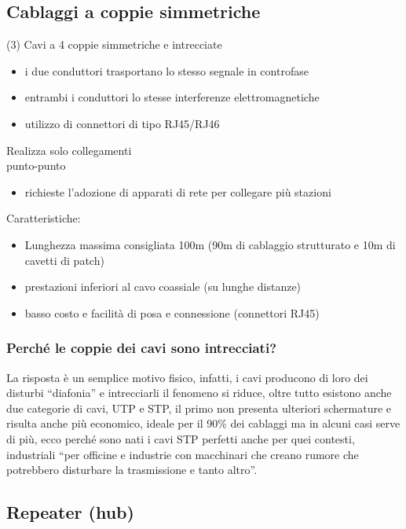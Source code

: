 \documentclass{book}
\begin{document}
\subsection{Cablaggi a coppie simmetriche}
\begin{tasks}(3)
	\task Cavi a 4 coppie simmetriche e intrecciate
	\begin{itemize}
		\item i due conduttori trasportano lo stesso segnale in controfase
		\item entrambi i conduttori lo stesse interferenze elettromagnetiche
		\item utilizzo di connettori di tipo RJ45/RJ46
	\end{itemize}
	\task Realizza solo collegamenti\\ punto-punto
	\begin{itemize}
		\item richieste l'adozione di apparati di rete per collegare più
			stazioni
	\end{itemize}
	\task Caratteristiche:
	\begin{itemize}
		\item Lunghezza massima consigliata 100m (90m di cablaggio strutturato
			e 10m di cavetti di patch)
		\item prestazioni inferiori al cavo coassiale (su lunghe distanze)
		\item basso costo e facilità di posa e connessione (connettori RJ45)
	\end{itemize}
\end{tasks}
\subsubsection{Perché le coppie dei cavi sono intrecciati?}
La risposta è un semplice motivo fisico, infatti, i cavi producono di loro dei
disturbi ``diafonia'' e intrecciarli il fenomeno si riduce, oltre tutto
esistono anche due categorie di cavi, UTP e STP, il primo non presenta
ulteriori schermature e risulta anche più economico, ideale per il 90\% dei
cablaggi ma in alcuni casi serve di più, ecco perché sono nati i cavi STP
perfetti anche per quei contesti, industriali ``per officine e industrie con
macchinari che creano rumore che potrebbero disturbare la trasmissione e tanto
altro''.
\subsection{Repeater (hub)}
\end{document}
